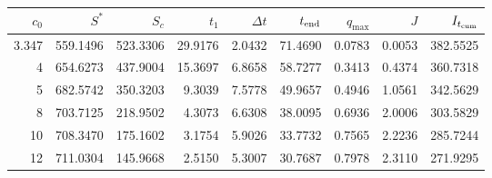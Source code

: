 {\setlength{\tabcolsep}{3pt}
\begin{tabular}{@{}rrrrrrrrr@{}}
\toprule
$c_0$ & $S^*$ & $S_c$ & $t_1$ & $\Delta t$ & $t_{\rm end}$ & $q_{\max}$ & $J$ & $I_{t_{\mathrm{cum}}}$ \\
\midrule
3.347 & 559.1496 & 523.3306 & 29.9176 & 2.0432 & 71.4690 & 0.0783 & 0.0053 & 382.5525 \\
4 & 654.6273 & 437.9004 & 15.3697 & 6.8658 & 58.7277 & 0.3413 & 0.4374 & 360.7318 \\
5 & 682.5742 & 350.3203 & 9.3039 & 7.5778 & 49.9657 & 0.4946 & 1.0561 & 342.5629 \\
8 & 703.7125 & 218.9502 & 4.3073 & 6.6308 & 38.0095 & 0.6936 & 2.0006 & 303.5829 \\
10 & 708.3470 & 175.1602 & 3.1754 & 5.9026 & 33.7732 & 0.7565 & 2.2236 & 285.7244 \\
12 & 711.0304 & 145.9668 & 2.5150 & 5.3007 & 30.7687 & 0.7978 & 2.3110 & 271.9295 \\
\bottomrule
\end{tabular}}
